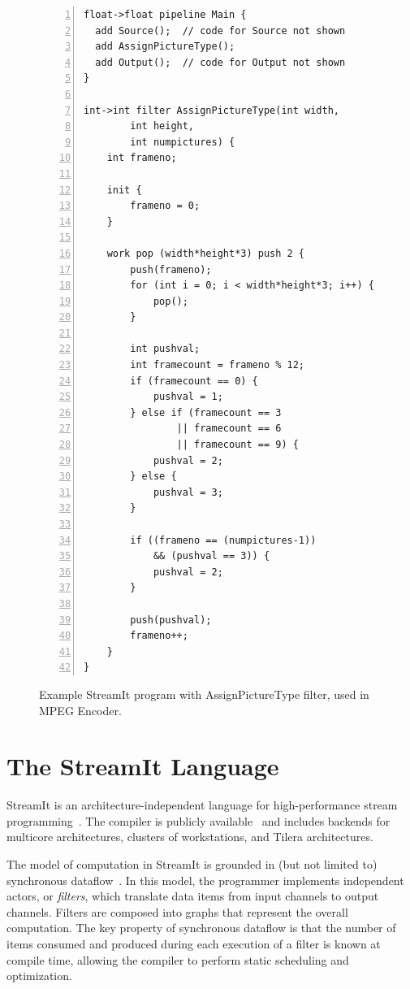 \begin{figure}[t]
\eightpoint
\begin{Verbatim}[numbers = left]
float->float pipeline Main {
  add Source();  // code for Source not shown
  add AssignPictureType();
  add Output();  // code for Output not shown
}

int->int filter AssignPictureType(int width, 
        int height, 
        int numpictures) {
    int frameno;

    init {
        frameno = 0;
    }

    work pop (width*height*3) push 2 {
        push(frameno);
        for (int i = 0; i < width*height*3; i++) {
            pop();
        }

        int pushval;
        int framecount = frameno % 12;
        if (framecount == 0) {
            pushval = 1;
        } else if (framecount == 3 
                || framecount == 6 
                || framecount == 9) {
            pushval = 2;
        } else {
            pushval = 3;
        }

        if ((frameno == (numpictures-1)) 
            && (pushval == 3)) {
            pushval = 2;
        }

        push(pushval);
        frameno++;
    }
}
\end{Verbatim}

\caption{Example StreamIt program with AssignPictureType filter, used in MPEG Encoder.\protect\label{fig:apt-pipeline}}
\end{figure}

\section{The StreamIt Language}
\label{sec:streamit}

StreamIt is an architecture-independent language for high-performance
stream programming~\cite{thies-cc02}.  The compiler is publicly
available~\cite{streamitweb} and includes backends for multicore
architectures, clusters of workstations, and Tilera architectures.

The model of computation in StreamIt is grounded in (but not limited
to) synchronous dataflow~\cite{lee87}.  In this model, the programmer
implements independent actors, or {\it filters}, which translate data
items from input channels to output channels.  Filters are composed
into graphs that represent the overall computation.  The key property
of synchronous dataflow is that the number of items consumed and
produced during each execution of a filter is known at compile time,
allowing the compiler to perform static scheduling and optimization.

